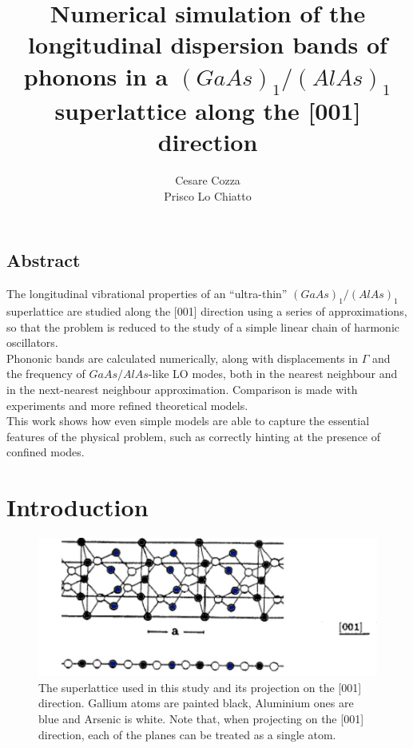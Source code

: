 \documentclass{article}
\begin{document}
 
	
	\author{Cesare Cozza \\ Prisco Lo Chiatto }
	\title{Numerical simulation of the longitudinal dispersion bands of phonons in a $(GaAs)_1/(AlAs)_1$ superlattice along the [001] direction}
	\maketitle
    
	\begin{center}
	\section*{Abstract}
	\end{center}
	

	The longitudinal vibrational properties of an “ultra-thin” $(GaAs)_1/(AlAs)_1$ superlattice are studied along the [001] direction using a series of approximations, so that the problem is reduced to the study of a simple linear chain of harmonic oscillators.\\
	Phononic bands are calculated numerically, along with displacements in $\Gamma$ and the frequency of $GaAs/AlAs$-like LO modes, both in the nearest neighbour and in the next-nearest neighbour approximation. Comparison is made with experiments and more refined theoretical models.\\
This work shows how even simple models are able to capture the essential features of the physical problem, such as correctly hinting at the presence of confined modes.


    \newpage
\section*{Introduction}
\begin{figure}
	\centering
	\includegraphics[scale=0.3]{reticolo.jpg}
	\caption{The superlattice used in this study and its projection on the [001] direction. Gallium atoms are painted black, Aluminium ones are blue and Arsenic is white. Note that, when projecting on the [001] direction, each of the planes can be treated as a single atom.}
	\label{fig:reticolo}
\end{figure}
\end{document}
